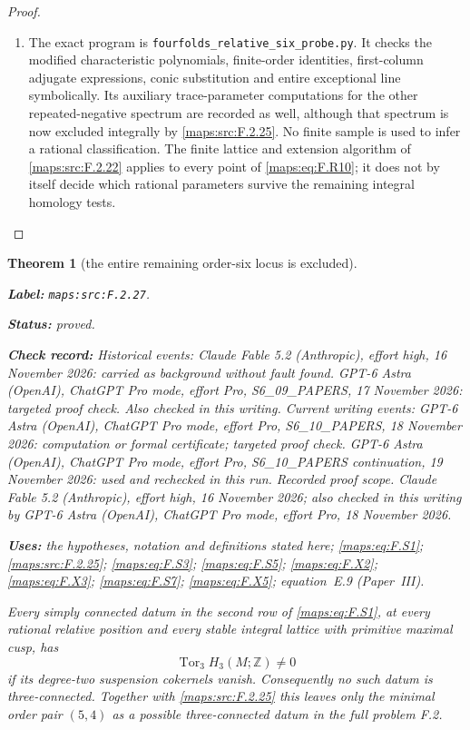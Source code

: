 \documentclass[11pt,a4paper]{article}
\newtheorem{theorem}{Theorem}[section]
\theoremstyle{definition}
\newcommand{\StatementRecord}[4]{\par\smallskip\begingroup\upshape\raggedright\noindent\textbf{Label:} \nolinkurl{#1}.\par\noindent\textbf{Status:} #2.\par\noindent\textbf{Check record:} #3.\par\noindent\textbf{Uses:} #4.\par\endgroup\smallskip}
\newcommand{\ExternalPaperRef}[3]{\ifmmode\text{\upshape #1#2 (Paper~#3)}\else #1#2 (Paper~#3)\fi}
\begin{document}
\begin{proof}
\begin{enumerate}[label=\arabic*.]
\item The exact program is
\texttt{fourfolds\_relative\_six\_probe.py}.
It checks the modified characteristic polynomials, finite-order
identities, first-column adjugate expressions, conic
substitution and entire exceptional line symbolically.
Its auxiliary trace-parameter computations for the other
repeated-negative spectrum are recorded as well, although
that spectrum is now excluded integrally by \ref{maps:src:F.2.25}.
No finite sample is used to infer a rational classification.
The finite lattice and extension algorithm of \ref{maps:src:F.2.22} applies
to every point of \eqref{maps:eq:F.R10}; it does not by itself decide
which rational parameters survive the remaining integral
homology tests.

\end{enumerate}
\end{proof}




\begin{theorem}[the entire remaining order-six locus is excluded]\label{maps:src:F.2.27}
\StatementRecord{maps:src:F.2.27}{proved}{Historical events: Claude Fable 5.2 (Anthropic), effort high, 16 November 2026: carried as background without fault found. GPT-6 Astra (OpenAI), ChatGPT Pro mode, effort Pro, S6\_09\_PAPERS, 17 November 2026: targeted proof check. Also checked in this writing. Current writing events: GPT-6 Astra (OpenAI), ChatGPT Pro mode, effort Pro, S6\_10\_PAPERS, 18 November 2026: computation or formal certificate; targeted proof check. GPT-6 Astra (OpenAI), ChatGPT Pro mode, effort Pro, S6\_10\_PAPERS continuation, 19 November 2026: used and rechecked in this run. \emph{Recorded proof scope.} Claude Fable 5.2 (Anthropic), effort high, 16 November 2026; also checked in this writing by GPT-6 Astra (OpenAI), ChatGPT Pro mode, effort Pro, 18 November 2026}{the hypotheses, notation and definitions stated here; \cref{maps:eq:F.S1}; \cref{maps:src:F.2.25}; \cref{maps:eq:F.S3}; \cref{maps:eq:F.S5}; \cref{maps:eq:F.X2}; \cref{maps:eq:F.X3}; \cref{maps:eq:F.S7}; \cref{maps:eq:F.X5}; \ExternalPaperRef{equation~}{{E.9}}{III}}


Every simply connected datum in the second row of \eqref{maps:eq:F.S1},
at every rational relative position and every stable integral
lattice with primitive maximal cusp, has
\[
                 \operatorname{Tor}_3 H_3(M;\mathbb Z)\ne0
\]
if its degree-two suspension cokernels vanish.
Consequently no such datum is three-connected.  Together with
\ref{maps:src:F.2.25} this leaves only the minimal order pair $(5,4)$ as a
possible three-connected datum in the full problem F.2.
\end{theorem}
\end{document}
